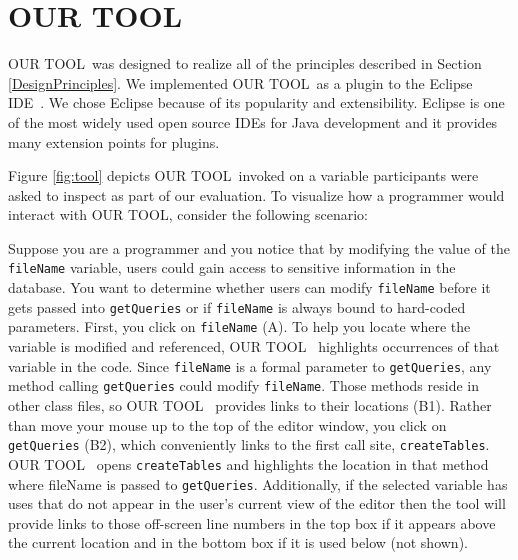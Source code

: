 \documentclass[conference]{IEEEtran}
\newcommand{\toolName}{OUR TOOL}
\begin{document}
\section{\toolName}
\toolName~was designed to realize all of the principles described in Section \ref{DesignPrinciples}. 
We implemented \toolName~as a plugin to the Eclipse IDE~\cite{Eclipse}. 
We chose Eclipse because of its popularity and extensibility. 
Eclipse is one of the most widely used open source IDEs for Java development and it provides many extension points for plugins. 

Figure \ref{fig:tool} depicts \toolName~invoked on a variable participants were asked to inspect as part of our evaluation. To visualize how a programmer would interact with \toolName, consider the following scenario:


Suppose you are a programmer and you notice that by modifying the value of the \texttt{fileName} variable, users could gain access to sensitive information in the database. 
You want to determine whether users can modify \texttt{fileName} before it gets passed into \texttt{getQueries} or if \texttt{fileName} is always bound to hard-coded parameters. 
First, you click on \texttt{fileName} (A). 
To help you locate where the variable is modified and referenced, \toolName~ highlights occurrences of that variable in the code.
Since \texttt{fileName} is a formal parameter to \texttt{getQueries}, any method calling \texttt{getQueries} could modify \texttt{fileName}. 
Those methods reside in other class files, so \toolName~ provides links to their locations (B1).
Rather than move your mouse up to the top of the editor window, you click on \texttt{getQueries} (B2), which conveniently links to the first call site, \texttt{createTables}. 
\toolName~ opens \texttt{createTables} and highlights the location in that method where fileName is passed to \texttt{getQueries}.  
Additionally, if the selected variable has uses that do not appear in the user's current view of the editor then the tool will provide links to those off-screen line numbers in the top box if it appears above the current location and in the bottom box if it is used below (not shown).

\end{document}
